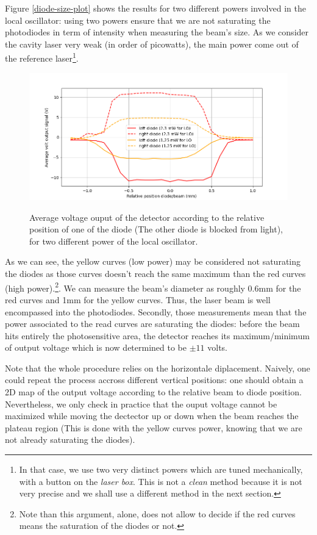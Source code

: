 \documentclass[12pt]{report}
\begin{document}
Figure \ref{diode-size-plot} shows the results for two different powers involved in the local oscillator: using two powers ensure that we are not saturating the photodiodes in term of intensity when measuring the beam's size. As we consider the cavity laser very weak (in order of picowatts), the main power come out of the reference laser\footnote{In that case, we use two very distinct powers which are tuned mechanically, with a button on the \textit{laser box}. This is not a \textit{clean} method because it is not very precise and we shall use a different method in the next section.}.

\begin{figure}[h!]
\caption{Average voltage ouput of the detector according to the relative position of one of the diode (The other diode is blocked from light), for two different power of the local oscillator.}
\centering
\includegraphics[width=\textwidth]{diode-size-plot}
\label{fig:diode-size-plot}
\end{figure}

As we can see, the yellow curves (low power) may be considered not saturating the diodes as those curves doesn't reach the same maximum than the red curves (high power).\footnote{Note than this argument, alone, does not allow to decide if the red curves means the saturation of the diodes or not.}. We can measure the beam's diameter as roughly 0.6mm for the red curves and 1mm for the yellow curves. Thus, the laser beam is well encompassed into the photodiodes. Secondly, those measurements mean that the power associated to the read curves are saturating the diodes: before the beam hits entirely the photosensitive area, the detector reaches its maximum/minimum of output voltage which is now determined to be $\pm11$ volts.

Note that the whole procedure relies on the horizontale diplacement. Naively, one could repeat the process accross different vertical positions: one should obtain a 2D map of the output voltage according to the relative beam to diode position. Nevertheless, we only check in practice that the ouput voltage cannot be maximized while moving the dectector up or down when the beam reaches the plateau region (This is done with the yellow curves power, knowing that we are not already saturating the diodes).
\end{document}

